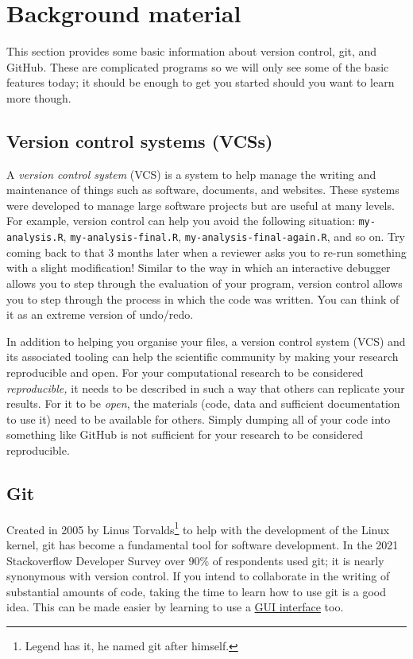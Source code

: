 \documentclass[11pt,onecolumn]{scrartcl}
\begin{document}
\section{Background material}
\label{sec:orgac4e4b4}

This section provides some basic information about version control, git, and
GitHub. These are complicated programs so we will only see some of the basic
features today; it should be enough to get you started should you want to learn
more though.

\subsection{Version control systems (VCSs)}
\label{sec:orgd7cdc8c}

A \emph{version control system} (VCS) is a system to help manage the writing and
maintenance of things such as software, documents, and websites. These systems
were developed to manage large software projects but are useful at many levels.
For example, version control can help you avoid the following situation:
\texttt{my-analysis.R}, \texttt{my-analysis-final.R}, \texttt{my-analysis-final-again.R}, and so on.
Try coming back to that 3 months later when a reviewer asks you to re-run
something with a slight modification! Similar to the way in which an interactive
debugger allows you to step through the evaluation of your program, version
control allows you to step through the process in which the code was written.
You can think of it as an extreme version of undo/redo.

In addition to helping you organise your files, a version control system (VCS)
and its associated tooling can help the scientific community by making your
research reproducible and open. For your computational research to be considered
\emph{reproducible,} it needs to be described in such a way that others can replicate
your results. For it to be \emph{open}, the materials (code, data and sufficient
documentation to use it) need to be available for others. Simply dumping all of
your code into something like GitHub is not sufficient for your research to be
considered reproducible.

\subsection{Git}
\label{sec:orgf7d6014}

Created in 2005 by Linus Torvalds\footnote{Legend has it, he named git after himself.} to help with the development of the
Linux kernel, git has become a fundamental tool for software development. In the
2021 Stackoverflow Developer Survey over \(90\%\) of respondents used git; it is
nearly synonymous with version control. If you intend to collaborate in the
writing of substantial amounts of code, taking the time to learn how to use git
is a good idea. This can be made easier by learning to use a \hyperref[sec:org8497bad]{GUI interface} too.
\end{document}
